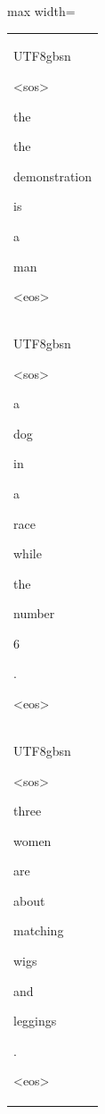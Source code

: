 \documentclass[varwidth=598pt]{standalone}
\begin{document}
\begin{table}
\centering
\begin{adjustbox}{max width=\textwidth}
    \begin{tabular}{@{}l@{}}
    \toprule
    \begin{CJK*}{UTF8}{gbsn}
    {\setlength{\fboxsep}{0.34pt}\colorbox{white!0}{\parbox{0.99\textwidth}{
    \colorbox{red!0.0}{\strut <sos>} \colorbox{red!13.618934194312317}{\strut the}   \colorbox{red!64.29599135349474}{\strut the} \colorbox{red!62.63966240078204}{\strut demonstration} \colorbox{red!5.960305932080871}{\strut is} \colorbox{red!41.211336835076175}{\strut a} \colorbox{red!57.44349825486538}{\strut man} \colorbox{red!4.771411459373127}{\strut <eos>}
    }}}
    \end{CJK*} \\
    \begin{CJK*}{UTF8}{gbsn}
    {\setlength{\fboxsep}{0.3pt}\colorbox{white!0}{\parbox{0.99\textwidth}{
    \colorbox{red!2.792607802874741}{\strut <sos>} \colorbox{red!0.0}{\strut a} \colorbox{red!40.664603638256644}{\strut dog}  \colorbox{red!29.627787257425453}{\strut in} \colorbox{red!27.762385400699884}{\strut a} \colorbox{red!36.98527923185932}{\strut race} \colorbox{red!1.3384619833993696}{\strut while}  \colorbox{red!71.1553923128091}{\strut the} \colorbox{red!56.417271596726145}{\strut number} \colorbox{red!30.62613876276137}{\strut 6} \colorbox{red!3.572895277207394}{\strut .} \colorbox{red!6.915579720623526}{\strut <eos>}
    }}}
    \end{CJK*} \\
    \begin{CJK*}{UTF8}{gbsn}
    {\setlength{\fboxsep}{0.34pt}\colorbox{white!0}{\parbox{0.99\textwidth}{
    \colorbox{red!26.78751436908658}{\strut <sos>} \colorbox{red!47.498452559908046}{\strut three} \colorbox{red!60.91903203937867}{\strut women} \colorbox{red!29.1207592772718}{\strut are}  \colorbox{red!24.007427712441427}{\strut about}  \colorbox{red!32.821646476257854}{\strut matching} \colorbox{red!17.1721637633743}{\strut wigs} \colorbox{red!49.57644354054294}{\strut and}  \colorbox{red!41.08409231585463}{\strut leggings} \colorbox{red!0.0}{\strut .} \colorbox{red!29.629498629410207}{\strut <eos>}
}}}
\end{CJK*}
\end{tabular}
\end{adjustbox}
\end{table}
\end{document}
